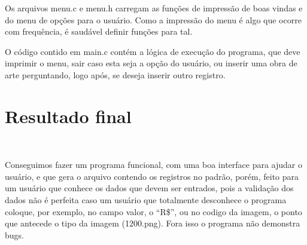 \documentclass{article}
\begin{document}
Os arquivos menu.c e menu.h carregam as funções de impressão de boas vindas e do menu de opções para o usuário. Como a impressão do menu é algo que ocorre com frequência, é saudável definir funções para tal.

O código contido em main.c contém a lógica de execução do programa, que deve imprimir o menu, sair caso esta seja a opção do usuário, ou inserir uma obra de arte perguntando, logo após, se deseja inserir outro registro.

\section*{Resultado final}\

   Conseguimos fazer um programa funcional, com uma boa interface para ajudar o usuário, e que gera o arquivo contendo os registros no padrão, porém, feito para um usuário que conhece os dados que devem ser entrados, pois a validação dos dados não é perfeita caso um usuário que totalmente desconhece o programa coloque, por exemplo, no campo valor, o ``R\$'', ou no codigo da imagem, o ponto que antecede o tipo da imagem (1200.png). Fora isso o programa não demonstra bugs.
\end{document}
